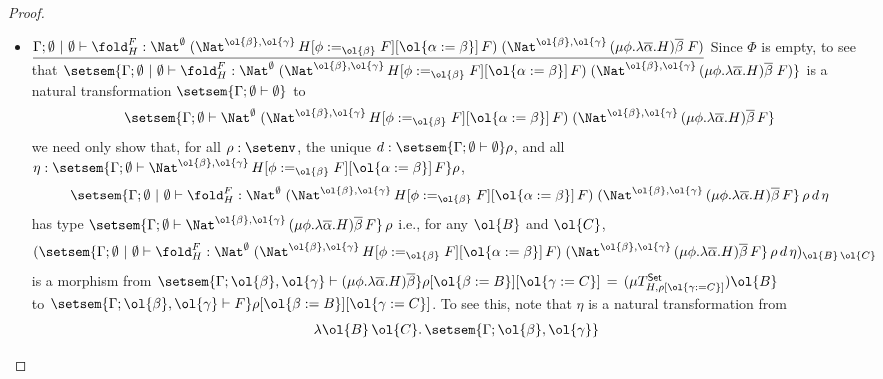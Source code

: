 \documentclass[acmsmall,review,anonymous]{acmart}
\theoremstyle{definition}
\newcommand{\set}{\mathsf{Set}}
\begin{document}
\begin{proof}
\begin{itemize}
\item
$\underline{\Gamma; \emptyset~|~\emptyset \vdash \fold^F_H :
  \Nat^\emptyset\;(\Nat^{\ol{\beta}, \ol{\gamma}}\,H[\phi
    :=_{\ol{\beta}} F][\ol{\alpha := \beta}]\,F)\;
  (\Nat^{{\ol{\beta},\ol{\gamma}} }\,(\mu \phi.\lambda \overline
  \alpha.H)\overline \beta \;F)}$ \; Since $\Phi$ is empty, to see
  that $\setsem{ \Gamma; \emptyset~|~\emptyset \vdash \fold^F_H :
    \Nat^\emptyset\;(\Nat^{\ol{\beta}, \ol{\gamma}}\,H[\phi
      :=_{\ol{\beta}} F][\ol{\alpha := \beta}]\,F)\;
    (\Nat^{{\ol{\beta},\ol{\gamma}} }\,(\mu \phi.\lambda \overline
    \alpha.H)\overline \beta \;F)}$ is a natural transformation
  $\setsem{\Gamma;\emptyset \vdash \emptyset}$ to \[\setsem{\Gamma;
    \emptyset \vdash \Nat^\emptyset\;(\Nat^{\ol{\beta},
      \ol{\gamma}}\,H[\phi :=_{\ol{\beta}} F][\ol{\alpha :=
        \beta}]\,F)\; (\Nat^{{\ol{\beta},\ol{\gamma}} }\,(\mu
    \phi.\lambda \overline \alpha.H)\overline \beta\,F}\] we need only
  show that, for all $\rho : \setenv$, the unique $d :
  \setsem{\Gamma;\emptyset \vdash \emptyset} \rho$, and all $\eta :
  \setsem{\Gamma; \emptyset \vdash \Nat^{\ol{\beta},
      \ol{\gamma}}\,H[\phi :=_{\ol{\beta}} F][\ol{\alpha :=
        \beta}]\,F} \rho$,
\[ \setsem{\Gamma; \emptyset~|~\emptyset \vdash \fold^F_H :
  \Nat^\emptyset\;(\Nat^{\ol{\beta}, \ol{\gamma}}\,H[\phi
    :=_{\ol{\beta}} F][\ol{\alpha := \beta}]\,F)\;
  (\Nat^{{\ol{\beta},\ol{\gamma}} }\,(\mu \phi.\lambda \overline
  \alpha.H)\overline \beta\,F}\,\rho\,d\,\eta\] has type
$\setsem{\Gamma; \emptyset \vdash \Nat^{{\ol{\beta},\ol{\gamma}}
  }\,(\mu \phi.\lambda \overline \alpha.H)\overline \beta\,F}\,\rho$
i.e., for any $\ol{B}$ and $\ol{C}$,
\[(\setsem{\Gamma; \emptyset~|~\emptyset \vdash \fold^F_H :
  \Nat^\emptyset\;(\Nat^{\ol{\beta}, \ol{\gamma}}\,H[\phi
    :=_{\ol{\beta}} F][\ol{\alpha := \beta}]\,F)\;
  (\Nat^{{\ol{\beta},\ol{\gamma}} }\,(\mu \phi.\lambda \overline
  \alpha.H)\overline \beta\,F}\,\rho\,d\,\eta)_{\ol{B}\,\ol{C}}\] is a
morphism from $\setsem{\Gamma; \ol{\beta},\ol{\gamma} \vdash (\mu
  \phi.\lambda \overline \alpha.H)\overline \beta}\rho[\ol{\beta :=
    B}][\ol{\gamma := C}] \,=\,(\mu T^\set_{H,\rho[\ol{\gamma := C}]})
\ol{B}$\\ to $\setsem{\Gamma; \ol{\beta},\ol{\gamma} \vdash
  F}\rho[\ol{\beta := B}][\ol{\gamma := C}]$.  To see this, note
that $\eta$ is a natural transformation from
\[\begin{array}{ll}
 & \lambda \ol{B}\,\ol{C}.\,\setsem{\Gamma; \ol{\beta},\ol{\gamma}
}
\end{array}\]
\end{itemize}
\end{proof}
\end{document}
